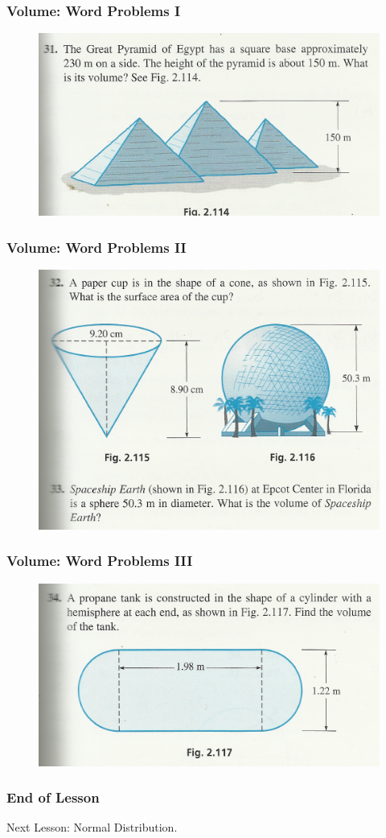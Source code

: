 \documentclass[xcolor=dvipsnames]{beamer}
\begin{document}
\begin{frame}
  \frametitle{Volume: Word Problems I}
  \begin{figure}[h]
    \includegraphics[scale=1]{./volume1.png}
  \end{figure}
\end{frame}

\begin{frame}
  \frametitle{Volume: Word Problems II}
  \begin{figure}[h]
    \includegraphics[scale=1]{./volume2.png}
  \end{figure}
\end{frame}

\begin{frame}
  \frametitle{Volume: Word Problems III}
  \begin{figure}[h]
    \includegraphics[scale=1]{./volume3.png}
  \end{figure}
\end{frame}

\begin{frame}
  \frametitle{End of Lesson}
Next Lesson: Normal Distribution.
\end{frame}
\end{document}

